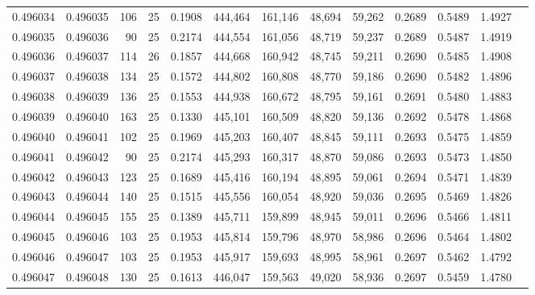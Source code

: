 \begin{tabular}{rrrrrrrrrrrrr}
0.496034 & 0.496035 &   106 &  25 &                                     0.1908 & 444,464 & 161,146 &  48,694 &  59,262 & 0.2689 & 0.5489 & 1.4927 \\
0.496035 & 0.496036 &    90 &  25 &                                     0.2174 & 444,554 & 161,056 &  48,719 &  59,237 & 0.2689 & 0.5487 & 1.4919 \\
0.496036 & 0.496037 &   114 &  26 &                                     0.1857 & 444,668 & 160,942 &  48,745 &  59,211 & 0.2690 & 0.5485 & 1.4908 \\
0.496037 & 0.496038 &   134 &  25 &                                     0.1572 & 444,802 & 160,808 &  48,770 &  59,186 & 0.2690 & 0.5482 & 1.4896 \\
0.496038 & 0.496039 &   136 &  25 &                                     0.1553 & 444,938 & 160,672 &  48,795 &  59,161 & 0.2691 & 0.5480 & 1.4883 \\
0.496039 & 0.496040 &   163 &  25 &                                     0.1330 & 445,101 & 160,509 &  48,820 &  59,136 & 0.2692 & 0.5478 & 1.4868 \\
0.496040 & 0.496041 &   102 &  25 &                                     0.1969 & 445,203 & 160,407 &  48,845 &  59,111 & 0.2693 & 0.5475 & 1.4859 \\
0.496041 & 0.496042 &    90 &  25 &                                     0.2174 & 445,293 & 160,317 &  48,870 &  59,086 & 0.2693 & 0.5473 & 1.4850 \\
0.496042 & 0.496043 &   123 &  25 &                                     0.1689 & 445,416 & 160,194 &  48,895 &  59,061 & 0.2694 & 0.5471 & 1.4839 \\
0.496043 & 0.496044 &   140 &  25 &                                     0.1515 & 445,556 & 160,054 &  48,920 &  59,036 & 0.2695 & 0.5469 & 1.4826 \\
0.496044 & 0.496045 &   155 &  25 &                                     0.1389 & 445,711 & 159,899 &  48,945 &  59,011 & 0.2696 & 0.5466 & 1.4811 \\
0.496045 & 0.496046 &   103 &  25 &                                     0.1953 & 445,814 & 159,796 &  48,970 &  58,986 & 0.2696 & 0.5464 & 1.4802 \\
0.496046 & 0.496047 &   103 &  25 &                                     0.1953 & 445,917 & 159,693 &  48,995 &  58,961 & 0.2697 & 0.5462 & 1.4792 \\
0.496047 & 0.496048 &   130 &  25 &                                     0.1613 & 446,047 & 159,563 &  49,020 &  58,936 & 0.2697 & 0.5459 & 1.4780 \\

\end{tabular}
